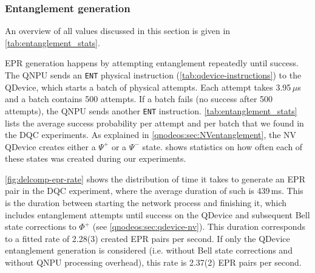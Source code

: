 \subsubsection{Entanglement generation}

An overview of all values discussed in this section is given in \cref{tab:entanglement_stats}.

\ac{EPR} generation happens by attempting entanglement repeatedly until success. The \ac{QNPU} sends an \texttt{ENT} physical instruction (\cref{tab:qdevice-instructions}) to the \ac{QDevice}, which starts a batch of physical attempts. Each attempt takes 3.95\,$\mu$s and a batch contains 500 attempts. If a batch fails (no success after 500 attempts), the \ac{QNPU} sends another \texttt{ENT} instruction. \cref{tab:entanglement_stats} lists the average success probability per attempt and per batch that we found in the \ac{DQC} experiments. As explained in \cref{qnodeos:sec:NVentanglement}, the \ac{NV} \ac{QDevice} creates either a $\Psi^+$ or a $\Psi^-$ state.  shows statistics on how often each of these states was created during our experiments.

\cref{fig:delcomp-epr-rate} shows the distribution of time it takes to generate an \ac{EPR} pair in the \ac{DQC} experiment, where the average duration of such is 439\,ms. This is the duration between starting the network process and finishing it, which includes entanglement attempts until success on the \ac{QDevice} and subsequent Bell state corrections to $\Phi^+$ (see \cref{qnodeos:sec:qdevice-nv}). This duration corresponds to a fitted rate of 2.28(3) created \ac{EPR} pairs per second. If only the \ac{QDevice} entanglement generation is considered (i.e. without Bell state corrections and without \ac{QNPU} processing overhead), this rate is 2.37(2) \ac{EPR} pairs per second.

